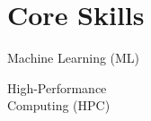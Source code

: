 \section*{Core Skills}
   { \setlength{\baselineskip}{10pt} \setlength{\parskip}{7.5pt} \scshape

    Machine Learning (ML)

    High-Performance\\Computing (HPC)

   }
